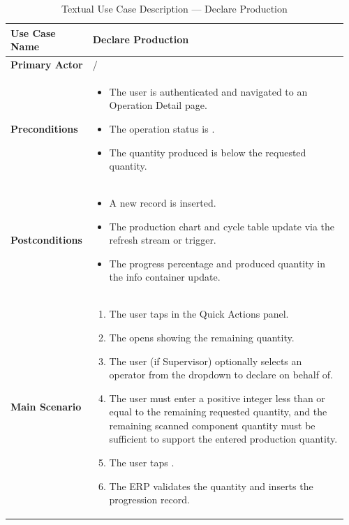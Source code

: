 \begin{longtable}{@{} P{0.21\linewidth} P{0.75\linewidth} @{}}
	\caption{Textual Use Case Description --- Declare Production}
	\label{tab:s3-uc-declare-production} \\
	\toprule
	\endfirsthead
	\midrule
	\endhead
	
	
	\bottomrule
	\endlastfoot
	
	\textbf{Use Case Name} & Declare Production \\
	\midrule
	\textbf{Primary Actor} &  /  \\
	\midrule
	\textbf{Preconditions} & 
	\begin{itemize}[nosep, leftmargin=*]
	\item The user is authenticated and navigated to an Operation Detail page.
	\item The operation status is .
	\item The quantity produced is below the requested quantity.
	\end{itemize} \\
	\midrule
	\textbf{Postconditions} & 
	\begin{itemize}[nosep, leftmargin=*]
	\item A new  record is inserted.
	\item The production chart and cycle table update via the refresh stream or trigger.
	\item The progress percentage and produced quantity in the info container update.
	\end{itemize} \\
	\midrule
	\textbf{Main Scenario} & 
	\begin{enumerate}[nosep, leftmargin=*]
	\item The user taps  in the Quick Actions panel.
	\item The  opens showing the remaining quantity.
	\item The user (if Supervisor) optionally selects an operator from the dropdown to declare on behalf of.
	\item The user must enter a positive integer less than or equal to the remaining requested quantity, 
	and the remaining scanned component quantity must be sufficient to support the entered production quantity.
	\item The user taps .
	\item The ERP validates the quantity and inserts the progression record.

\end{enumerate}
\end{longtable}
